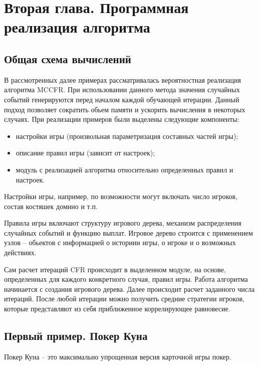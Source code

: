 \chapter{Вторая глава. Программная реализация алгоритма}
\label{cha:ch_2}
\section{Общая схема вычислений}

\par
В рассмотренных далее примерах рассматривалась вероятностная реализация алгоритма MCCFR. При использовании данного метода значения случайных событий генерируются перед началом каждой обучающей итерации. Данный подход позволяет сократить обьем памяти и ускорить вычисления в некоторых случаях\cite{MCCFR}.
При реализации примеров были выделены следующие компоненты:
\begin{itemize}
	\item настройки игры (произвольная параметризация составных частей игры);
	\item описание правил игры (зависит от настроек);
	\item модуль с реализацией алгоритма относительно определенных правил и настроек.
\end{itemize}
\par
Настройки игры, например, по возможности могут включать число игроков, состав костяшек домино и т.п.
\par
Правила игры включают структуру игрового дерева, механизм распределения случайных событий и функцию выплат. Игровое дерево строится с применением узлов -- обьектов с информацией о историии игры, о игроке и о возможных действиях.
\par
Сам расчет итераций CFR происходит в выделенном модуле, на основе, определенных для каждого конкретного случая, правил игры. Работа алгоритма начинается с создания игрового дерева. Далее происходит расчет заданного числа итераций. После любой итерации можно получить средние стратегии игроков, которые представляют из себя приближенное коррелирующее равновесие.
\section{Первый пример. Покер Куна}

Покер Куна – это максимально упрощенная версия карточной игры покер\cite{KuhnPoker}.

